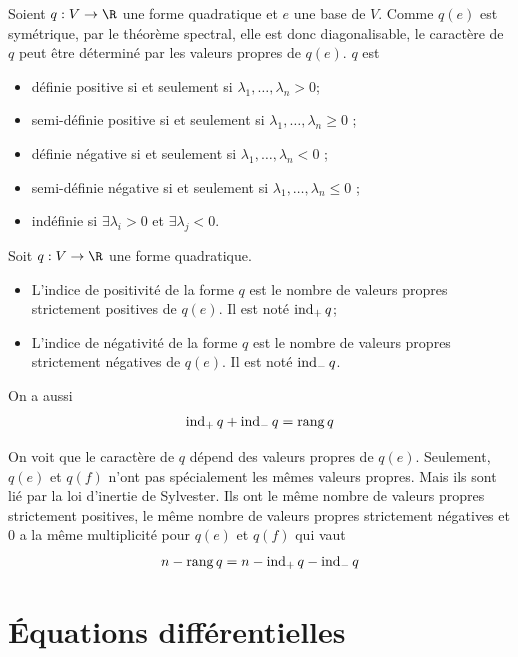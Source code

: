 \begin{myprop}
	Soient $q: V \to \R$ une forme quadratique et $e$ une base de $V$.
	Comme $q(e)$ est symétrique, par le théorème spectral, elle est donc diagonalisable,
	le caractère de $q$ peut être déterminé par les valeurs propres de $q(e)$. $q$ est
	\begin{itemize}
		\item définie positive si et seulement si $\lambda_1, \dots, \lambda_n > 0$;
		\item semi-définie positive si et seulement si $\lambda_1, \dots, \lambda_n \geq 0$ ;
		\item définie négative si et seulement si $\lambda_1, \dots, \lambda_n < 0$ ;
		\item semi-définie négative si et seulement si $\lambda_1, \dots, \lambda_n \leq 0$ ;
		\item indéfinie si $\exists  \lambda_i > 0$ et $\exists \lambda_j < 0$.
	\end{itemize}
\end{myprop}

\begin{myprop}
	Soit $q: V \to \R$ une forme quadratique.
	\begin{itemize}
		\item L'indice de positivité de la forme $q$ est le nombre de valeurs propres strictement positives de $q(e)$.
			Il est noté $\operatorname{ind}_+q$;
		\item L'indice de négativité de la forme $q$ est le nombre de valeurs propres strictement négatives de $q(e)$.
			Il est noté $\operatorname{ind}_-q$.
	\end{itemize}
	On a aussi
	\[ \operatorname{ind}_+q + \operatorname{ind}_-q = \operatorname{rang} q \]
\end{myprop}

\begin{myrem}
	On voit que le caractère de $q$ dépend des valeurs propres de $q(e)$.
	Seulement, $q(e)$ et $q(f)$ n'ont pas spécialement les mêmes valeurs propres.
	Mais ils sont lié par la loi d'inertie de Sylvester.
	Ils ont le même nombre de valeurs propres strictement positives,
	le même nombre de valeurs propres strictement négatives
	et 0 a la même multiplicité pour $q(e)$ et $q(f)$ qui vaut
	\[ n - \operatorname{rang} q = n - \operatorname{ind}_+q - \operatorname{ind}_-q \]
\end{myrem}

\part{Équations différentielles}

